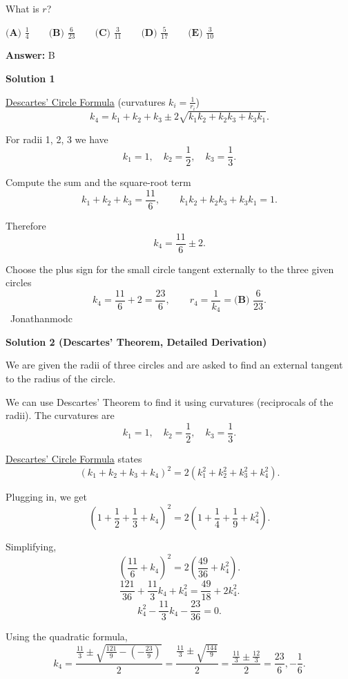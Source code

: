 \begin{enumerate}
 What is $r$?


 $\textbf{(A) }\frac{1}{4}\qquad\textbf{(B) }\frac{6}{23}\qquad\textbf{(C) }\frac{3}{11}\qquad\textbf{(D) }\frac{5}{17}\qquad\textbf{(E) }\frac{3}{10}$

 \textbf{Answer: }B



\textbf{Solution 1}

\href{https://artofproblemsolving.com/wiki/index.php?title=Descartes\%27\_Circle\_Formula}{Descartes' Circle Formula} (curvatures $k_i = \frac{1}{r_i}$)
 \[k_4 = k_1 + k_2 + k_3 \pm 2\sqrt{k_1k_2 + k_2k_3 + k_3k_1}.\]

 For radii 1, 2, 3 we have
 \[k_1 = 1,\quad k_2 = \frac{1}{2},\quad k_3 = \frac{1}{3}.\]

 Compute the sum and the square-root term
 \[k_1+k_2+k_3 = \frac{11}{6},\qquad k_1k_2+k_2k_3+k_3k_1 = 1.\]

 Therefore
 \[k_4 = \frac{11}{6} \pm 2.\]

 Choose the plus sign for the small circle tangent externally to the three given circles
 \[k_4 = \frac{11}{6} + 2 = \frac{23}{6}, \qquad r_4 = \frac{1}{k_4} = \boxed{\textbf{(B) }\frac{6}{23}}.\]~Jonathanmodc

 



\textbf{Solution 2 (Descartes’ Theorem, Detailed Derivation)}

We are given the radii of three circles and are asked to find an external tangent to the radius of the circle.

 We can use Descartes’ Theorem to find it using curvatures (reciprocals of the radii). The curvatures are
 \[k_1 = 1, \quad k_2 = \frac{1}{2}, \quad k_3 = \frac{1}{3}.\]

 \href{https://artofproblemsolving.com/wiki/index.php?title=Descartes\%27\_Circle\_Formula}{Descartes' Circle Formula} states
 \[(k_1 + k_2 + k_3 + k_4)^2 = 2(k_1^2 + k_2^2 + k_3^2 + k_4^2).\]

 Plugging in, we get
 \[\left(1 + \frac{1}{2} + \frac{1}{3} + k_4\right)^2 = 2\left(1 + \frac{1}{4} + \frac{1}{9} + k_4^2\right).\]

 Simplifying,
 \[\left(\frac{11}{6} + k_4\right)^2 = 2\left(\frac{49}{36} + k_4^2\right).\]
 \[\frac{121}{36} + \frac{11}{3}k_4 + k_4^2 = \frac{49}{18} + 2k_4^2.\]
 \[k_4^2 - \frac{11}{3}k_4 - \frac{23}{36} = 0.\]

 Using the quadratic formula,
 \[k_4 = \frac{\frac{11}{3} \pm \sqrt{\frac{121}{9} - (-\frac{23}{9})}}{2} = \frac{\frac{11}{3} \pm \sqrt{\frac{144}{9}}}{2} = \frac{\frac{11}{3} \pm \frac{12}{3}}{2} = \frac{23}{6}, -\frac{1}{6}.\]


\end{enumerate}
